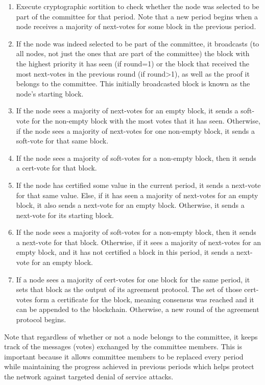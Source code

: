 \begin{enumerate}
  \item Execute cryptographic sortition to check whether the node was selected to be part of the committee for that period. Note that a new period begins when a node receives a majority of next-votes for some block in the previous period.
  \item If the node was indeed selected to be part of the committee, it broadcasts (to all nodes, not just the ones that are part of the committee) the block with the highest priority it has seen (if round=1) or the block that received the most next-votes in the previous round (if round>1), as well as the proof it belongs to the committee. This initially broadcasted block is known as the node’s starting block.
  \item If the node sees a majority of next-votes for an empty block, it sends a soft-vote for the non-empty block with the most votes that it has seen. Otherwise, if the node sees a majority of next-votes for one non-empty block, it sends a soft-vote for that same block.
  \item If the node sees a majority of soft-votes for a non-empty block, then it sends a cert-vote for that block.
  \item If the node has certified some value in the current period, it sends a next-vote for that same value. Else, if it has seen a majority of next-votes for an empty block, it also sends a next-vote for an empty block. Otherwise, it sends a next-vote for its starting block.
  \item If the node sees a majority of soft-votes for a non-empty block, then it sends a next-vote for that block. Otherwise, if it sees a majority of next-votes for an empty block, and it has not certified a block in this period, it sends a next-vote for an empty block.
  \item If a node sees a majority of cert-votes for one block for the same period, it sets that block as the output of its agreement protocol. The set of those cert-votes form a certificate for the block, meaning consensus was reached and it can be appended to the blockchain. Otherwise, a new round of the agreement protocol begins.
\end{enumerate}

Note that regardless of whether or not a node belongs to the committee, it keeps track of the messages (votes) exchanged by the committee members. This is important because it allows committee members to be replaced every period while maintaining the progress achieved in previous periods which helps protect the network against targeted denial of service attacks.


